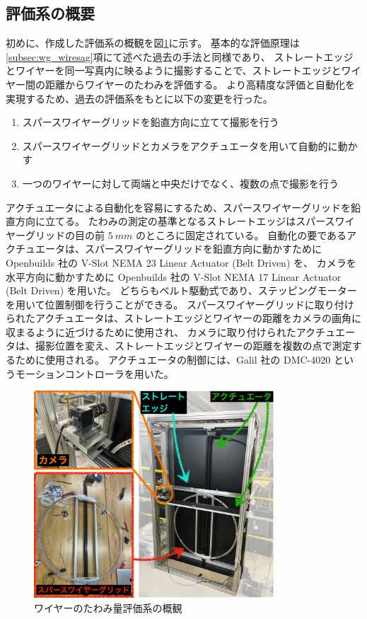 \documentclass[../../main.tex]{subfiles}
\begin{document}
\subsection{評価系の概要}
初めに、作成した評価系の概観を図\ref{fig:wiresag_system}に示す。
基本的な評価原理は\ref{subsec:wg_wiresag}項にて述べた過去の手法と同様であり、
ストレートエッジとワイヤーを同一写真内に映るように撮影することで、ストレートエッジとワイヤー間の距離からワイヤーのたわみを評価する。
より高精度な評価と自動化を実現するため、過去の評価系をもとに以下の変更を行った。
\begin{enumerate}
    \item スパースワイヤーグリッドを鉛直方向に立てて撮影を行う
    \item スパースワイヤーグリッドとカメラをアクチュエータを用いて自動的に動かす
    \item 一つのワイヤーに対して両端と中央だけでなく、複数の点で撮影を行う
\end{enumerate}

アクチュエータによる自動化を容易にするため、スパースワイヤーグリッドを鉛直方向に立てる。
たわみの測定の基準となるストレートエッジはスパースワイヤーグリッドの目の前 $\SI{5}{mm}$ のところに固定されている。
自動化の要であるアクチュエータは、スパースワイヤーグリッドを鉛直方向に動かすために Openbuilds 社の V-Slot NEMA 23 Linear Actuator (Belt Driven) を、
カメラを水平方向に動かすために Openbuilds 社の V-Slot NEMA 17 Linear Actuator (Belt Driven) を用いた。
どちらもベルト駆動式であり、ステッピングモーターを用いて位置制御を行うことができる。
スパースワイヤーグリッドに取り付けられたアクチュエータは、ストレートエッジとワイヤーの距離をカメラの画角に収まるように近づけるために使用され、
カメラに取り付けられたアクチュエータは、撮影位置を変え、ストレートエッジとワイヤーの距離を複数の点で測定するために使用される。
アクチュエータの制御には、Galil 社の DMC-4020 というモーションコントローラを用いた。

\begin{figure}[H]
    \centering
    \includegraphics[width=0.8\textwidth]{wiresag/wiresag_system.pdf}
    \caption{ワイヤーのたわみ量評価系の概観}
    \label{fig:wiresag_system}
\end{figure}
\end{document}
